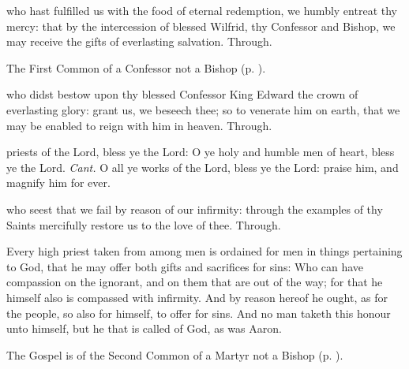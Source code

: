 \postcommunion
{} who hast fulfilled us with the food of eternal redemption, we humbly entreat thy mercy: that by the intercession of blessed Wilfrid, thy Confessor and Bishop, we may receive the gifts of everlasting salvation. Through.



\begin{rubric}
	The First Common of a Confessor not a Bishop (p. \pageref{CommonConfessorNotBishopI}).
\end{rubric}

\collect
{} who didst bestow upon thy blessed Confessor King Edward the crown of everlasting glory: grant us, we beseech thee; so to venerate him on earth, that we may be enabled to reign with him in heaven. Through.


\clearpage
{}

\introit
{} priests of the Lord, bless ye the Lord: O ye holy and humble men of heart, bless ye the Lord. \textit{Cant.} O all ye works of the Lord, bless ye the Lord: praise him, and magnify him for ever.

\collect
{} who seest that we fail by reason of our infirmity: through the examples of thy Saints mercifully restore us to the love of thee. Through.


 Every high priest taken from among men is ordained for men in things pertaining to God, that he may offer both gifts and sacrifices for sins: Who can have compassion on the ignorant, and on them that are out of the way; for that he himself also is compassed with infirmity. And by reason hereof he ought, as for the people, so also for himself, to offer for sins. And no man taketh this honour unto himself, but he that is called of God, as was Aaron.


\begin{rubric}
	The Gospel is of the Second Common of a Martyr not a Bishop (p. \pageref{CommonMartyrNotBishopIIGospel}).
\end{rubric}

